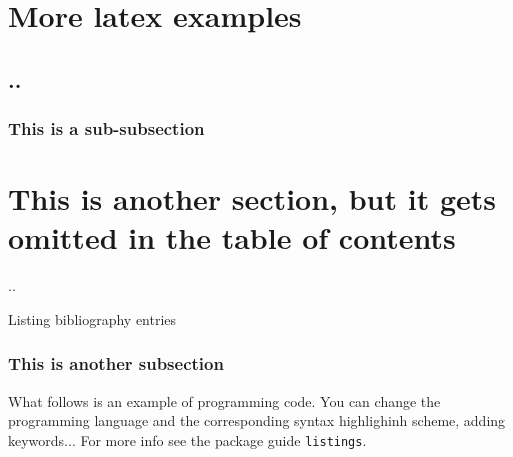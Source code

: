 \clearpage
\section{More latex examples}
\subsection{..}
\subsubsection{This is a sub-subsection}
\section*{This is another section, but it gets omitted in the table of contents}
..


Listing bibliography entries \citep{wei2021frequency, hu2020systematic, lau2020furiously, sprouse2016experimental, bostrom2020byte, futrell-etal-2019-neural}

\subsubsection{This is another subsection}

What follows is an example of programming code. You can change the programming language and the corresponding syntax highlighinh scheme, adding keywords... For more info see the package guide \texttt{listings}.

 
